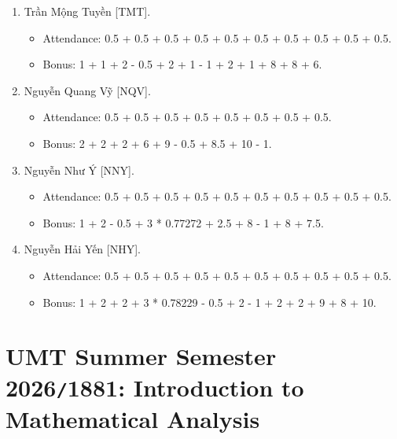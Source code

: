 \documentclass{article}
\begin{document}
\begin{enumerate}
\begin{itemize}
        \item Bonus: 3.79665 + 5 + 8.5 + 8.
    \end{itemize}
    \item {\sc Trần Mộng Tuyền [TMT].}
    \begin{itemize}
        \item Attendance: 0.5 + 0.5 + 0.5 + 0.5 + 0.5 + 0.5 + 0.5 + 0.5 + 0.5 + 0.5.
        \item Bonus: 1 + 1 + 2 - 0.5 + 2 + 1 - 1 + 2 + 1 + 8 + 8 + 6.
    \end{itemize}
    \item {\sc Nguyễn Quang Vỹ [NQV].}
    \begin{itemize}
        \item Attendance: 0.5 + 0.5 + 0.5 + 0.5 + 0.5 + 0.5 + 0.5 + 0.5.
        \item Bonus: 2 + 2 + 2 + 6 + 9 - 0.5 + 8.5 + 10 - 1.
    \end{itemize}
    \item {\sc Nguyễn Như Ý [NNY].}
    \begin{itemize}
        \item Attendance: 0.5 + 0.5 + 0.5 + 0.5 + 0.5 + 0.5 + 0.5 + 0.5 + 0.5 + 0.5.
        \item Bonus: 1 + 2 - 0.5 + 3 * 0.77272 + 2.5 + 8 - 1 + 8 + 7.5.
    \end{itemize}
    \item {\sc Nguyễn Hải Yến [NHY].}
    \begin{itemize}
        \item Attendance: 0.5 + 0.5 + 0.5 + 0.5 + 0.5 + 0.5 + 0.5 + 0.5 + 0.5 + 0.5.
        \item Bonus: 1 + 2 + 2 + 3 * 0.78229 - 0.5 + 2 - 1 + 2 + 2 + 9 + 8 + 10.
    \end{itemize}
\end{enumerate}


\section{UMT Summer Semester 2026{\tt/}1881: Introduction to Mathematical Analysis}
\end{document}
